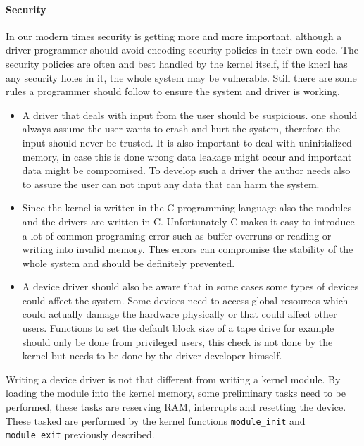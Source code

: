 \documentclass{sig-alternate-05-2015}
\begin{document}
\paragraph{Security}
In our modern times security is getting more and more important, although a driver programmer should avoid encoding security policies in their own code. The security policies are often and best handled by the kernel itself, if the knerl has any security holes in it, the whole system may be vulnerable. Still there are some rules a programmer should follow to ensure the system and driver is working.
\begin{itemize}
\item A driver that deals with input from the user should be suspicious. one should always assume the user wants to crash and hurt the system, therefore the input should never be trusted. It is also important to deal with uninitialized memory, in case this is done wrong data leakage might occur and important data might be compromised. To develop such a driver the author needs also to assure the user can not input any data that can harm the system.
\item Since the kernel is written in the C programming language also the modules and the drivers are written in C. Unfortunately C makes it easy to introduce a lot of common programing error such as buffer overruns or reading or writing into invalid memory. Thes errors can compromise the stability of the whole system and should be definitely prevented.
\item A device driver should also be aware that in some cases some types of devices could affect the system. Some devices need to access global resources which could actually damage the hardware physically or that could affect other users. Functions to set the default block size of a tape drive for example should only be done from privileged users, this check is not done by the kernel but needs to be done by the driver developer himself.
\end{itemize}

Writing a device driver is not that different from writing a kernel module. By loading the module into the kernel memory, some preliminary tasks need to be performed, these tasks are reserving RAM, interrupts and resetting the device. These tasked are performed by the kernel functions \texttt{module\_init} and \texttt{module\_exit} previously described. 
\end{document}
